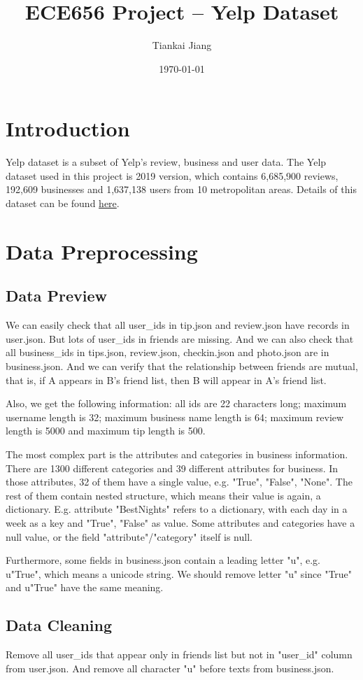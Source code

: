 \documentclass[12pt]{article}
\title{ECE656 Project -- Yelp Dataset}
\author{Tiankai Jiang}
\date{\today}
\begin{document}
\maketitle
\section{Introduction}\label{section-introduction}
Yelp dataset is a subset of Yelp's review, business and user data. The Yelp dataset used in this project is 2019 version, which contains 6,685,900 reviews, 192,609 businesses and 1,637,138 users from 10 metropolitan areas. Details of this dataset can be found \href{https://www.yelp.com/dataset/documentation/main}{here}.
\section{Data Preprocessing}\label{section-preprocessing}
\subsection{Data Preview}
We can easily check that all user\_ids in tip.json and review.json have records in user.json. But lots of user\_ids in friends are missing. And we can also check that all business\_ids in tips.json, review.json, checkin.json and photo.json are in business.json. And we can verify that the relationship between friends are mutual, that is, if A appears in B's friend list, then B will appear in A's friend list.

Also, we get the following information: all ids are 22 characters long; maximum username length is 32; maximum business name length is 64; maximum review length is 5000 and maximum tip length is 500. 

The most complex part is the attributes and categories in business information. There are 1300 different categories and 39 different attributes for business. In those attributes, 32 of them have a single value, e.g. "True", "False", "None". The rest of them contain nested structure, which means their value is again, a dictionary. E.g. attribute "BestNights" refers to a dictionary, with each day in a week as a key and "True", "False" as value. Some attributes and categories have a null value, or the field "attribute"/"category" itself is null.

Furthermore, some fields in business.json contain a leading letter "u", e.g. u"True", which means a unicode string. We should remove letter "u" since "True" and u"True" have the same meaning.
\subsection{Data Cleaning}
Remove all user\_ids that appear only in friends list but not in "user\_id" column from user.json. And remove all character "u" before texts from business.json.
\end{document}
